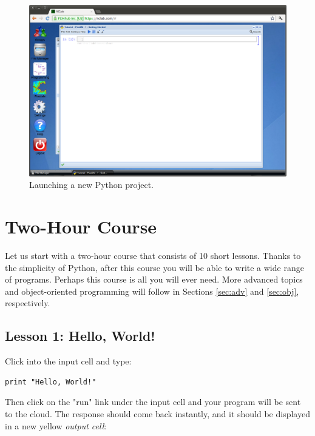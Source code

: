 \documentclass[article,A4,12pt]{llncs}
\begin{document}
\begin{figure}[!ht]
\begin{center}
\includegraphics[width=\textwidth]{img/python.png}
\end{center}
\vspace{-2mm}
\caption{Launching a new Python project.}
\label{fig:python}
\end{figure}
\vspace{-1cm}
\noindent
\newpage




\section{Two-Hour Course}

Let us start with a two-hour course that consists of 10 short lessons. Thanks to the 
simplicity of Python, after this course you will be able to write a wide range of 
programs. Perhaps this course is all you will ever need. More advanced topics and 
object-oriented programming will follow in Sections
\ref{sec:adv} and \ref{sec:obj}, respectively.

\subsection{Lesson 1: Hello, World!}

Click into the input cell and type:

\begin{verbatim}
print "Hello, World!"
\end{verbatim}
Then click on the "run" link under the input cell and your program will be sent to the 
cloud. The response should come back instantly, and it should be displayed 
in a new yellow {\em output cell}:
\end{document}
